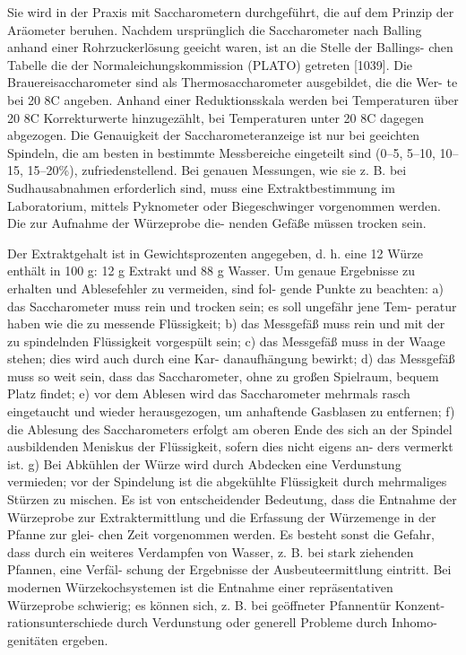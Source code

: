 \documentclass[a4paper,parskip=half]{scrartcl}
\begin{document}
Sie wird in der Praxis mit Saccharometern durchgeführt, die auf dem Prinzip
der Aräometer beruhen. Nachdem ursprünglich die Saccharometer nach Balling
anhand einer Rohrzuckerlösung geeicht waren, ist an die Stelle der Ballings-
chen Tabelle die der Normaleichungskommission (PLATO) getreten [1039]. Die
Brauereisaccharometer sind als Thermosaccharometer ausgebildet, die die Wer-
te bei 20 8C angeben. Anhand einer Reduktionsskala werden bei Temperaturen
über 20 8C Korrekturwerte hinzugezählt, bei Temperaturen unter 20 8C dagegen
abgezogen. Die Genauigkeit der Saccharometeranzeige ist nur bei geeichten
Spindeln, die am besten in bestimmte Messbereiche eingeteilt sind (0–5, 5–10,
10–15, 15–20\%), zufriedenstellend.
Bei genauen Messungen, wie sie z. B. bei Sudhausabnahmen erforderlich
sind, muss eine Extraktbestimmung im Laboratorium, mittels Pyknometer oder
Biegeschwinger vorgenommen werden. Die zur Aufnahme der Würzeprobe die-
nenden Gefäße müssen trocken sein.

Der Extraktgehalt ist in Gewichtsprozenten angegeben, d. h. eine 12%
Würze enthält in 100 g: 12 g Extrakt und 88 g Wasser.
Um genaue Ergebnisse zu erhalten und Ablesefehler zu vermeiden, sind fol-
gende Punkte zu beachten:
a) das Saccharometer muss rein und trocken sein; es soll ungefähr jene Tem-
peratur haben wie die zu messende Flüssigkeit;
b) das Messgefäß muss rein und mit der zu spindelnden Flüssigkeit vorgespült
sein;
c) das Messgefäß muss in der Waage stehen; dies wird auch durch eine Kar-
danaufhängung bewirkt;
d) das Messgefäß muss so weit sein, dass das Saccharometer, ohne zu großen
Spielraum, bequem Platz findet;
e) vor dem Ablesen wird das Saccharometer mehrmals rasch eingetaucht und
wieder herausgezogen, um anhaftende Gasblasen zu entfernen;
f) die Ablesung des Saccharometers erfolgt am oberen Ende des sich an der
Spindel ausbildenden Meniskus der Flüssigkeit, sofern dies nicht eigens an-
ders vermerkt ist.
g) Bei Abkühlen der Würze wird durch Abdecken eine Verdunstung vermieden;
vor der Spindelung ist die abgekühlte Flüssigkeit durch mehrmaliges
Stürzen zu mischen.
Es ist von entscheidender Bedeutung, dass die Entnahme der Würzeprobe zur
Extraktermittlung und die Erfassung der Würzemenge in der Pfanne zur glei-
chen Zeit vorgenommen werden. Es besteht sonst die Gefahr, dass durch ein
weiteres Verdampfen von Wasser, z. B. bei stark ziehenden Pfannen, eine Verfäl-
schung der Ergebnisse der Ausbeuteermittlung eintritt.
Bei modernen Würzekochsystemen ist die Entnahme einer repräsentativen
Würzeprobe schwierig; es können sich, z. B. bei geöffneter Pfannentür Konzent-
rationsunterschiede durch Verdunstung oder generell Probleme durch Inhomo-
genitäten ergeben.
\autocite{Narziss2009}
\end{document}
